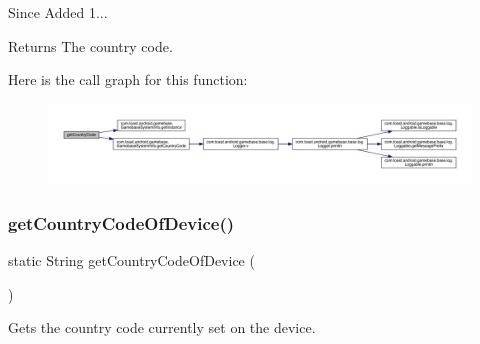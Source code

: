 \begin{DoxySince}{Since}
Added 1... 
\end{DoxySince}
\begin{DoxyReturn}{Returns}
The country code. 
\end{DoxyReturn}
Here is the call graph for this function\+:
\nopagebreak
\begin{figure}[H]
\begin{center}
\leavevmode
\includegraphics[width=350pt]{classcom_1_1toast_1_1android_1_1gamebase_1_1_gamebase_a57662f504668587ba2a1d667a48c9732_cgraph}
\end{center}
\end{figure}
\mbox{\label{classcom_1_1toast_1_1android_1_1gamebase_1_1_gamebase_aa5cb9db9a02d57d19f78a34a1adbdc95}} 
\subsubsection{\texorpdfstring{get\+Country\+Code\+Of\+Device()}{getCountryCodeOfDevice()}}
{\footnotesize\ttfamily static String get\+Country\+Code\+Of\+Device (\begin{DoxyParamCaption}{ }\end{DoxyParamCaption})\hspace{0.3cm}{\ttfamily [static]}}



Gets the country code currently set on the device. 

